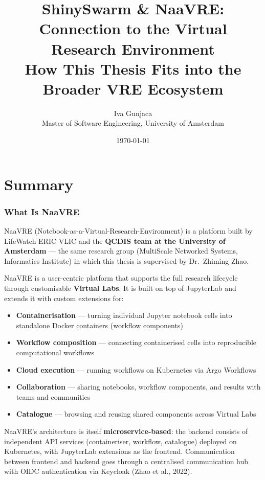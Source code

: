 \documentclass[12pt,a4paper]{article}
\title{\textbf{ShinySwarm \& NaaVRE: Connection to the Virtual Research Environment}\\[0.5em]
\large How This Thesis Fits into the Broader VRE Ecosystem}
\author{Iva Gunjaca\\
Master of Software Engineering, University of Amsterdam}
\date{\today}
\begin{document}
\maketitle
\tableofcontents
\newpage

\part{Summary}

\section{What Is NaaVRE}

NaaVRE (Notebook-as-a-Virtual-Research-Environment) is a platform built by LifeWatch ERIC VLIC and the \textbf{QCDIS team at the University of Amsterdam} --- the same research group (MultiScale Networked Systems, Informatics Institute) in which this thesis is supervised by Dr.\ Zhiming Zhao.

NaaVRE is a user-centric platform that supports the full research lifecycle through customisable \textbf{Virtual Labs}. It is built on top of JupyterLab and extends it with custom extensions for:

\begin{itemize}[nosep]
  \item \textbf{Containerisation} --- turning individual Jupyter notebook cells into standalone Docker containers (workflow components)
  \item \textbf{Workflow composition} --- connecting containerised cells into reproducible computational workflows
  \item \textbf{Cloud execution} --- running workflows on Kubernetes via Argo Workflows
  \item \textbf{Collaboration} --- sharing notebooks, workflow components, and results with teams and communities
  \item \textbf{Catalogue} --- browsing and reusing shared components across Virtual Labs
\end{itemize}

NaaVRE's architecture is itself \textbf{microservice-based}: the backend consists of independent API services (containeriser, workflow, catalogue) deployed on Kubernetes, with JupyterLab extensions as the frontend. Communication between frontend and backend goes through a centralised communication hub with OIDC authentication via Keycloak (Zhao et al., 2022).
\end{document}
